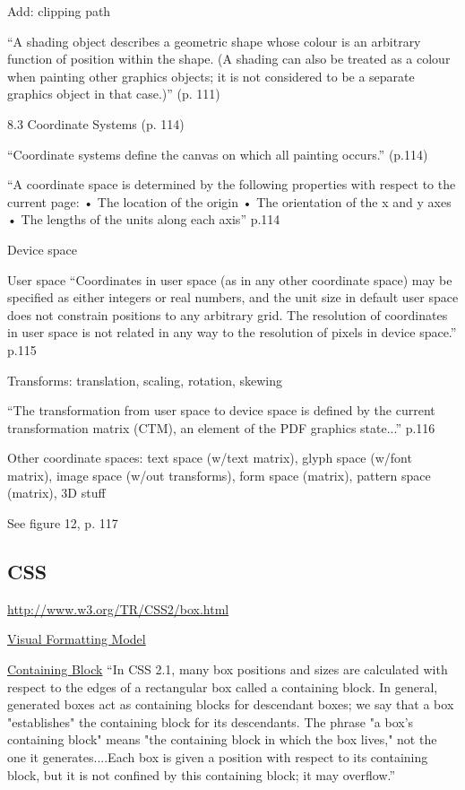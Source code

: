 \documentclass{tufte-handout}
\numberwithin{equation}{subsection}
\begin{document}
Add: clipping path

``A shading object describes a geometric shape whose colour is an arbitrary function of position within the shape. (A shading can also be treated as a colour when painting other graphics objects; it is not considered to be a separate graphics object in that case.)'' (p. 111)


8.3 Coordinate Systems (p. 114)

``Coordinate systems define the canvas on which all painting occurs.'' (p.114)

``A coordinate space is determined by the following properties with respect to the current page:
• The location of the origin
• The orientation of the x and y axes
• The lengths of the units along each axis'' p.114

Device space

User space
``Coordinates in user space (as in any other coordinate space) may be specified as either integers or real numbers, and the unit size in default user space does not constrain positions to any arbitrary grid. The resolution of coordinates in user space is not related in any way to the resolution of pixels in device space.'' p.115

Transforms: translation, scaling, rotation, skewing


``The transformation from user space to device space is defined by the current transformation matrix (CTM), an element of the PDF graphics state...'' p.116

Other coordinate spaces: text space (w/text matrix), glyph space
(w/font matrix), image space (w/out transforms), form space (matrix),
pattern space (matrix), 3D stuff

See figure 12, p. 117

\subsection{CSS}

\url{http://www.w3.org/TR/CSS2/box.html}

\href{http://www.w3.org/TR/CSS2/visuren.html}{Visual Formatting Model}

\href{http://www.w3.org/TR/CSS2/visuren.html#containing-block}{Containing
  Block} ``In CSS 2.1, many box positions and sizes are calculated
with respect to the edges of a rectangular box called a containing
block. In general, generated boxes act as containing blocks for
descendant boxes; we say that a box "establishes" the containing block
for its descendants. The phrase "a box's containing block" means "the
containing block in which the box lives," not the one it
generates....Each box is given a position with respect to its
containing block, but it is not confined by this containing block; it
may overflow.''
\end{document}
